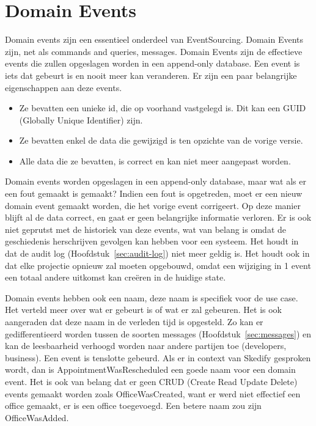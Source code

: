 
\section{Domain Events}
\label{sec:domain-events}

Domain events zijn een essentieel onderdeel van EventSourcing. Domain Events zijn, net als commands and queries, messages. Domain Events zijn de effectieve events die zullen opgeslagen worden in een append-only database. Een event is iets dat gebeurt is en nooit meer kan veranderen. Er zijn een paar belangrijke eigenschappen aan deze events.

\begin{itemize}
  \item{Ze bevatten een unieke id, die op voorhand vastgelegd is. Dit kan een GUID (Globally Unique Identifier) zijn.}
  \item{Ze bevatten enkel de data die gewijzigd is ten opzichte van de vorige versie.}
  \item{Alle data die ze bevatten, is correct en kan niet meer aangepast worden.}
\end{itemize}

Domain events worden opgeslagen in een append-only database, maar wat als er een fout gemaakt is gemaakt?
Indien een fout is opgetreden, moet er een nieuw domain event gemaakt worden, die het vorige event corrigeert. Op deze manier blijft al de data correct, en gaat er geen belangrijke informatie verloren. Er is ook niet geprutst met de historiek van deze events, wat van belang is omdat de geschiedenis herschrijven gevolgen kan hebben voor een systeem. Het houdt in dat de audit log (Hoofdstuk~\ref{sec:audit-log}) niet meer geldig is. Het houdt ook in dat elke projectie opnieuw zal moeten opgebouwd, omdat een wijziging in 1 event een totaal andere uitkomst kan creëren in de huidige state.

Domain events hebben ook een naam, deze naam is specifiek voor de use case. Het verteld meer over wat er gebeurt is of wat er zal gebeuren. Het is ook aangeraden dat deze naam in de verleden tijd is opgesteld. Zo kan er gedifferentieerd worden tussen de soorten messages (Hoofdstuk~\ref{sec:messages}) en kan de leesbaarheid verhoogd worden naar andere partijen toe (developers, business). Een event is tenslotte gebeurd. Als er in context van Skedify gesproken wordt, dan is AppointmentWasRescheduled een goede naam voor een domain event. Het is ook van belang dat er geen CRUD (Create Read Update Delete) events gemaakt worden zoals OfficeWasCreated, want er werd niet effectief een office gemaakt, er is een office toegevoegd. Een betere naam zou zijn OfficeWasAdded.
